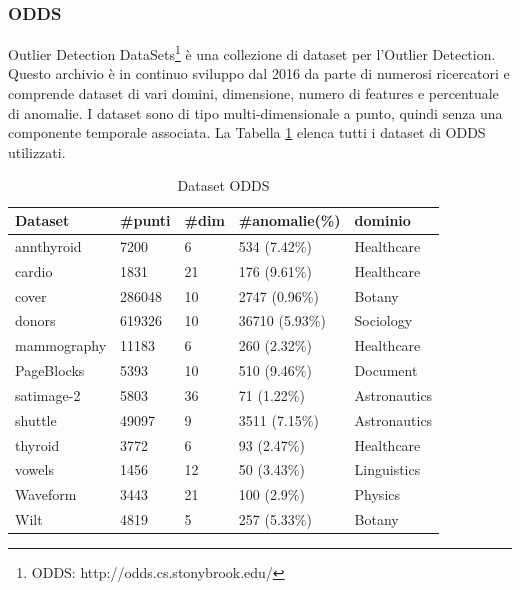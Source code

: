 \subsubsection{ODDS}
Outlier Detection DataSets\footnote{ODDS: http://odds.cs.stonybrook.edu/} è una collezione di dataset per l'Outlier Detection. Questo archivio è in continuo sviluppo dal 2016 da parte di numerosi ricercatori e comprende dataset di vari domini, dimensione, numero di features e percentuale di anomalie. 
I dataset sono di tipo multi-dimensionale a punto, quindi senza una componente temporale associata.
La Tabella \ref{odds} elenca tutti i dataset di ODDS utilizzati.

\begin{table}
	
	\centering
	\begin{tabular}{|l|l|l|l|l|}
		\hline
		\textbf{Dataset} & \textbf{\#punti} & \textbf{\#dim} & \textbf{\#anomalie(\%)} & \textbf{dominio} \\ \hline
		annthyroid       & 7200              & 6              & 534 (7.42\%)            & Healthcare      \\ \hline
		cardio           & 1831              & 21             & 176 (9.61\%)            & Healthcare      \\ \hline
		cover            & 286048            & 10             & 2747 (0.96\%)           & Botany          \\ \hline
		donors           & 619326            & 10             & 36710 (5.93\%)          & Sociology       \\ \hline
		mammography      & 11183             & 6              & 260 (2.32\%)            & Healthcare      \\ \hline
		PageBlocks       & 5393              & 10             & 510 (9.46\%)            & Document        \\ \hline
		satimage-2       & 5803              & 36             & 71 (1.22\%)             & Astronautics    \\ \hline
		shuttle          & 49097             & 9              & 3511 (7.15\%)           & Astronautics    \\ \hline
		thyroid          & 3772              & 6              & 93 (2.47\%)             & Healthcare      \\ \hline
		vowels           & 1456              & 12             & 50 (3.43\%)             & Linguistics     \\ \hline
		Waveform         & 3443              & 21             & 100 (2.9\%)             & Physics         \\ \hline
		Wilt             & 4819              & 5              & 257 (5.33\%)            & Botany          \\ \hline
	\end{tabular}
	\caption{\label{odds}Dataset ODDS}
\end{table}

